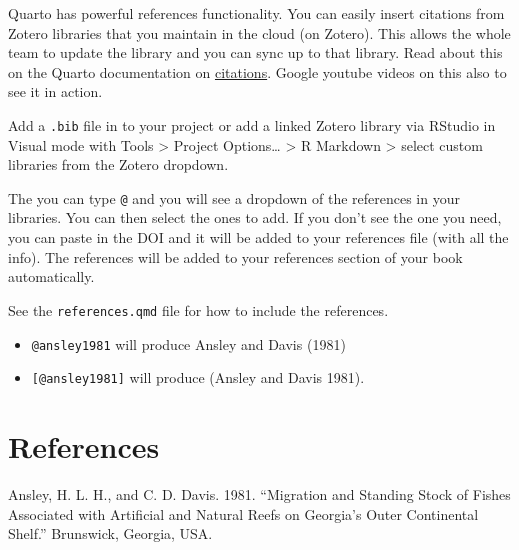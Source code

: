 \documentclass[
  letterpaper,
  oneside,
  open=any]{scrbook}
\newlength{\cslhangindent}
\newenvironment{CSLReferences}[2] %
 {\begin{list}{}{%
  \setlength{\itemindent}{0pt}
  \setlength{\leftmargin}{0pt}
  \setlength{\parsep}{0pt}
  \ifodd #1
   \setlength{\leftmargin}{\cslhangindent}
   \setlength{\itemindent}{-1\cslhangindent}
  \fi
  \setlength{\itemsep}{#2\baselineskip}}}
 {\end{list}}
\begin{document}
Quarto has powerful references functionality. You can easily insert
citations from Zotero libraries that you maintain in the cloud (on
Zotero). This allows the whole team to update the library and you can
sync up to that library. Read about this on the Quarto documentation on
\href{https://quarto.org/docs/visual-editor/technical.html\#citations}{citations}.
Google youtube videos on this also to see it in action.

Add a \texttt{.bib} file in to your project or add a linked Zotero
library via RStudio in Visual mode with Tools \textgreater{} Project
Options\ldots{} \textgreater{} R Markdown \textgreater{} select custom
libraries from the Zotero dropdown.

The you can type \texttt{@} and you will see a dropdown of the
references in your libraries. You can then select the ones to add. If
you don't see the one you need, you can paste in the DOI and it will be
added to your references file (with all the info). The references will
be added to your references section of your book automatically.

See the \texttt{references.qmd} file for how to include the references.

\begin{itemize}
\item
  \texttt{@ansley1981} will produce Ansley and Davis (1981)
\item
  \texttt{{[}@ansley1981{]}} will produce (Ansley and Davis 1981).
\end{itemize}


\chapter*{References}\label{references-1}


\label{refs}
\begin{CSLReferences}{1}{0}
Ansley, H. L. H., and C. D. Davis. 1981. {``Migration and Standing Stock
of Fishes Associated with Artificial and Natural Reefs on Georgia{'}s
Outer Continental Shelf.''} Brunswick, Georgia, USA.

\end{CSLReferences}


\backmatter
\end{document}
